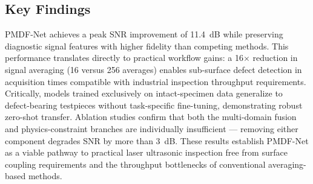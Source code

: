 \subsection{Key Findings}
\label{sec:conclusion-findings}

PMDF-Net achieves a peak SNR improvement of \SI{11.4}{dB} while preserving diagnostic signal features with higher fidelity than competing methods. This performance translates directly to practical workflow gains: a \num{16}$\times$ reduction in signal averaging (16 versus 256 averages) enables sub-surface defect detection in acquisition times compatible with industrial inspection throughput requirements. Critically, models trained exclusively on intact-specimen data generalize to defect-bearing testpieces without task-specific fine-tuning, demonstrating robust zero-shot transfer. Ablation studies confirm that both the multi-domain fusion and physics-constraint branches are individually insufficient — removing either component degrades SNR by more than \SI{3}{dB}. These results establish PMDF-Net as a viable pathway to practical laser ultrasonic inspection free from surface coupling requirements and the throughput bottlenecks of conventional averaging-based methods.
